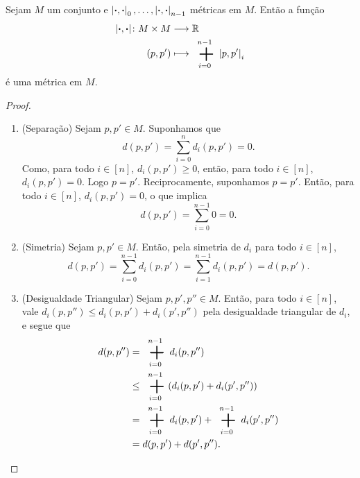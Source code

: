 \begin{proposition}
Sejam $M$ um conjunto e $\left\vert{\bm{\cdot}},{\bm{\cdot}}\right\vert_0, \ldots, \left\vert{\bm{\cdot}},{\bm{\cdot}}\right\vert_{n-1}$ métricas em $M$. Então a função
	\begin{align*}
		\func{\dist{\var}{\var}}{M \times M}{\R}{(p,p')}{\sum_{i=0}^{n-1} \dist{p}{p'}_i}
	\end{align*}
é uma métrica em $M$.
\end{proposition}
\begin{proof}
	\begin{enumerate}
	\item (Separação) Sejam $p,p' \in M$. Suponhamos que
	\begin{equation*}
	d(p,p') = \sum_{i=0}^n d_i(p,p') = 0.
	\end{equation*}
Como, para todo $i \in [n]$, $d_i(p,p') \geq 0$, então, para todo $i \in [n]$, $d_i(p,p') = 0$. Logo $p=p'$. Reciprocamente, suponhamos $p=p'$. Então, para todo $i \in [n]$, $d_i(p,p')=0$, o que implica
	\begin{equation*}
	d(p,p') = \sum_{i=0}^{n-1} 0 = 0.
	\end{equation*}
	
	\item (Simetria) Sejam $p,p' \in M$. Então, pela simetria de $d_i$ para todo $i \in [n]$,
	\begin{equation*}
	d(p,p') = \sum_{i=0}^{n-1} d_i(p,p') = \sum_{i=1}^{n-1} d_i(p,p') = d(p,p').
	\end{equation*}
	
	\item (Desigualdade Triangular) Sejam $p,p',p'' \in M$. Então, para todo $i \in [n]$, vale $d_i(p,p'') \leq d_i(p,p')+d_i(p',p'')$ pela desigualdade triangular de $d_i$, e segue que
	\begin{align*}
	d(p,p'') &= \sum_{i=0}^{n-1} d_i(p,p'') \\
				&\leq \sum_{i=0}^{n-1} (d_i(p,p')+d_i(p',p'')) \\
				&= \sum_{i=0}^{n-1} d_i(p,p') + \sum_{i=0}^{n-1} d_i(p',p'') \\
				&= d(p,p')+d(p',p''). \qedhere
	\end{align*}
	\end{enumerate}
\end{proof}


